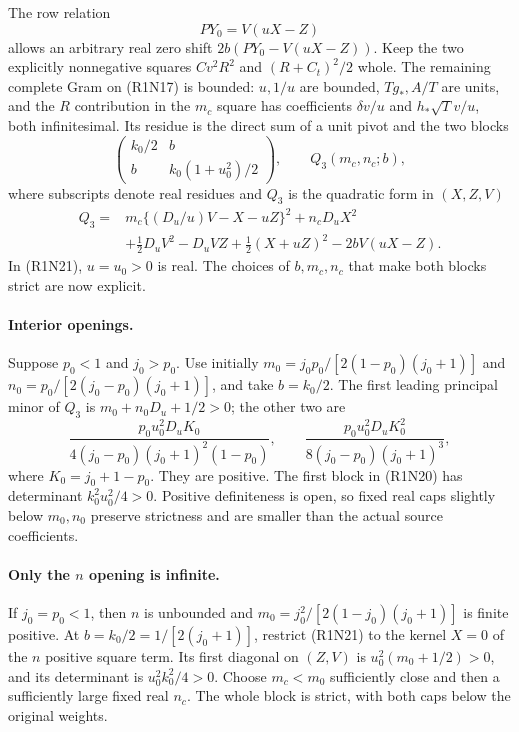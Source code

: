 The row relation
\[
 PY_0=V(uX-Z)                                            \tag{R1N19}
\]
allows an arbitrary real zero shift
$2b(PY_0-V(uX-Z))$.  Keep the two explicitly nonnegative squares
$Cv^2R^2$ and $(R+C_t)^2/2$ whole.  The remaining complete Gram
on (R1N17) is bounded: $u,1/u$ are bounded, $Tg_*,A/T$ are
units, and the $R$ contribution in the $m_c$ square has coefficients
$\delta v/u$ and $h_*\sqrt T v/u$, both infinitesimal.
Its residue is the direct sum of a unit pivot and the two blocks
\[
 \begin{pmatrix}k_0/2&b\\b&k_0(1+u_0^2)/2\end{pmatrix},\qquad
 Q_3(m_c,n_c;b),                                        \tag{R1N20}
\]
where subscripts denote real residues and $Q_3$ is the quadratic
form in $(X,Z,V)$
\begin{align*}
 Q_3={}&m_c\{(D_u/u)V-X-uZ\}^2+n_cD_uX^2\\
       &+\tfrac12D_uV^2-D_uVZ+\tfrac12(X+uZ)^2
                                            -2bV(uX-Z).
\tag{R1N21}
\end{align*}
In (R1N21), $u=u_0>0$ is real.  The choices of $b,m_c,n_c$
that make both blocks strict are now explicit.

\paragraph{Interior openings.}
Suppose $p_0<1$ and $j_0>p_0$.  Use initially
$m_0=j_0p_0/[2(1-p_0)(j_0+1)]$ and
$n_0=p_0/[2(j_0-p_0)(j_0+1)]$, and take $b=k_0/2$.
The first leading principal minor of $Q_3$ is
$m_0+n_0D_u+1/2>0$; the other two are
\[
 \frac{p_0u_0^2D_uK_0}
      {4(j_0-p_0)(j_0+1)^2(1-p_0)},\qquad
 \frac{p_0u_0^2D_uK_0^2}{8(j_0-p_0)(j_0+1)^3},          \tag{R1N22}
\]
where $K_0=j_0+1-p_0$.  They are positive.
The first block in (R1N20) has determinant
$k_0^2u_0^2/4>0$.  Positive definiteness is open, so fixed
real caps slightly below $m_0,n_0$ preserve strictness and are
smaller than the actual source coefficients.

\paragraph{Only the \(n\) opening is infinite.}
If $j_0=p_0<1$, then $n$ is unbounded and
$m_0=j_0^2/[2(1-j_0)(j_0+1)]$ is finite positive.
At $b=k_0/2=1/[2(j_0+1)]$, restrict (R1N21) to the kernel
$X=0$ of the $n$ positive square term.  Its first diagonal on $(Z,V)$ is
$u_0^2(m_0+1/2)>0$, and its determinant is
$u_0^2k_0^2/4>0$.  Choose $m_c<m_0$ sufficiently close and
then a sufficiently large fixed real $n_c$.  The whole block is
strict, with both caps below the original weights.

